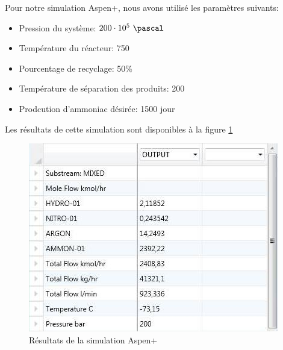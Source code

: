 Pour notre simulation Aspen+, nous avons utilisé les paramètres suivants:
\begin{itemize}
	\item Pression du système: $200\cdot10^5\ \pascal$
	\item Température du réacteur: 750 \kelvin
	\item Pourcentage de recyclage: 50\%
	\item Température de séparation des produits: 200 \kelvin
	\item Prodcution d'ammoniac désirée: 1500 \ton \per jour
\end{itemize}

Les résultats de cette simulation sont disponibles à la figure \ref{Aspen_results}
\\
\begin{figure}[h]
	\begin{center}
	\includegraphics[scale=0.6]{task2/Aspen_results_img}
	\end{center}
	\caption{Résultats de la simulation Aspen+}
	\label{Aspen_results}
\end{figure}
	